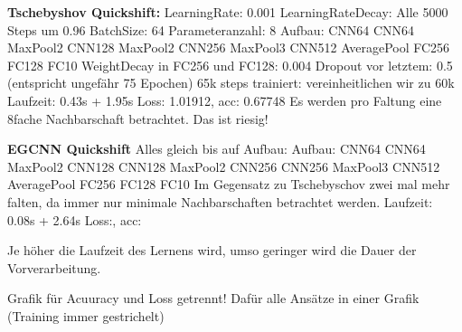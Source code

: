 









\textbf{Tschebyshov Quickshift:}
LearningRate: 0.001
LearningRateDecay: Alle 5000 Steps um 0.96
BatchSize: 64
Parameteranzahl: 8
Aufbau: CNN64 CNN64 MaxPool2 CNN128 MaxPool2 CNN256 MaxPool3 CNN512 AveragePool FC256 FC128 FC10
WeightDecay in FC256 und FC128: 0.004
Dropout vor letztem: 0.5 (entspricht ungefähr 75 Epochen)
65k steps trainiert: vereinheitlichen wir zu 60k
Laufzeit: 0.43s + 1.95s
Loss: 1.01912, acc: 0.67748
Es werden pro Faltung eine 8fache Nachbarschaft betrachtet.
Das ist riesig!

\textbf{EGCNN Quickshift}
Alles gleich bis auf Aufbau:
Aufbau: CNN64 CNN64 MaxPool2 CNN128 CNN128 MaxPool2 CNN256 CNN256 MaxPool3 CNN512 AveragePool FC256 FC128 FC10
Im Gegensatz zu Tschebyschov zwei mal mehr falten, da immer nur minimale Nachbarschaften betrachtet werden.
Laufzeit: 0.08s + 2.64s
Loss:, acc:

Je höher die Laufzeit des Lernens wird, umso geringer wird die Dauer der Vorverarbeitung.

Grafik für Acuuracy und Loss getrennt!
Dafür alle Ansätze in einer Grafik (Training immer gestrichelt)
